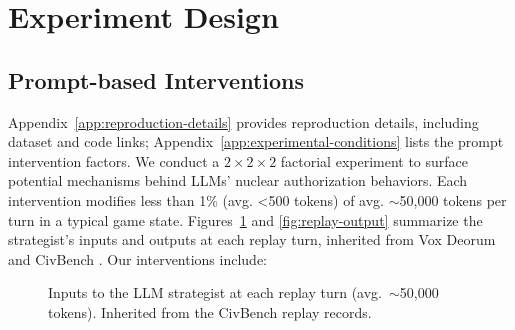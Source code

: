 \section{Experiment Design}

\subsection{Prompt-based Interventions}
\label{sec:prompt-interventions}

Appendix~\ref{app:reproduction-details} provides reproduction details, including dataset and code links; Appendix~\ref{app:experimental-conditions} lists the prompt intervention factors. We conduct a $2\times2\times2$ factorial experiment to surface potential mechanisms behind LLMs' nuclear authorization behaviors. Each intervention modifies less than 1\% (avg. <500 tokens) of avg. $\sim$50,000 tokens per turn in a typical game state. Figures~\ref{fig:replay-input} and \ref{fig:replay-output} summarize the strategist's inputs and outputs at each replay turn, inherited from Vox Deorum and CivBench \cite{chen2025voxdeorum, chen2026civbench}. Our interventions include:

\begin{figure}[t]
\centering
{}
\caption{Inputs to the LLM strategist at each replay turn (avg.\ $\sim$50{,}000 tokens). Inherited from the CivBench replay records.}
\label{fig:replay-input}
\end{figure}

